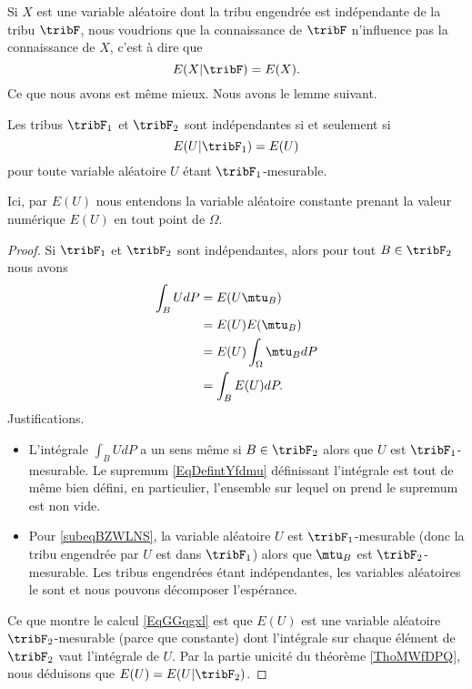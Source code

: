 Si \( X\) est une variable aléatoire dont la tribu engendrée est indépendante de la tribu \( \tribF\), nous voudrions que la connaissance de \( \tribF\) n'influence pas la connaissance de \( X\), c'est à dire que
\begin{equation}
    E(X|\tribF)=E(X).
\end{equation}
Ce que nous avons est même mieux. Nous avons le lemme suivant.
\begin{lemma}     \label{LemxUZFPV}
    Les tribus \( \tribF_1\) et \( \tribF_2\) sont indépendantes si et seulement si
    \begin{equation}
        E(U|\tribF_1)=E(U)
    \end{equation}
    pour toute variable aléatoire \( U\) étant \( \tribF_1\)-mesurable.
\end{lemma}
Ici, par \( E(U)\) nous entendons la variable aléatoire constante prenant la valeur numérique \( E(U)\) en tout point de \( \Omega\).

\begin{proof}
    Si \( \tribF_1\) et \( \tribF_2\) sont indépendantes, alors pour tout \( B\in\tribF_2\) nous avons
    \begin{subequations}    \label{EqGGqgxl}
            \begin{align}
                \int_B UdP&=E(U\mtu_B)\\
                &=E(U)E(\mtu_B)         \label{subeqBZWLNS}\\
                &=E(U)\int_{\Omega}\mtu_BdP\\
                &=\int_B E(U)dP.
            \end{align}
        \end{subequations}
    Justifications.
    \begin{itemize}
        \item L'intégrale \( \int_BUdP\) a un sens même si \( B\in\tribF_2\) alors que \( U\) est \( \tribF_1\)-mesurable. Le supremum \eqref{EqDefintYfdmu} définissant l'intégrale est tout de même bien défini, en particulier, l'ensemble sur lequel on prend le supremum est non vide.
        \item
            Pour \eqref{subeqBZWLNS}, la variable aléatoire \( U\) est \( \tribF_1\)-mesurable (donc la tribu engendrée par \( U\) est dans \( \tribF_1\)) alors que \( \mtu_B\) est \( \tribF_2\)-mesurable. Les tribus engendrées étant indépendantes, les variables aléatoires le sont et nous pouvons décomposer l'espérance.
    \end{itemize}
    Ce que montre le calcul \eqref{EqGGqgxl} est que \( E(U)\) est une variable aléatoire \( \tribF_2\)-mesurable (parce que constante) dont l'intégrale sur chaque élément de \( \tribF_2\) vaut l'intégrale de \( U\). Par la partie unicité du théorème \ref{ThoMWfDPQ}, nous déduisons que \( E(U)=E(U|\tribF_2)\).
\end{proof}

